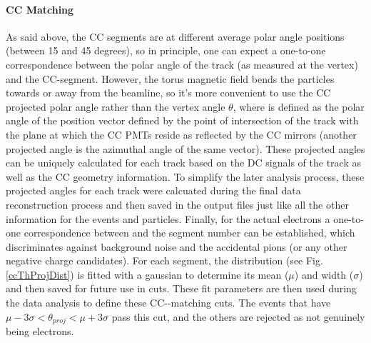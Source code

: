 \paragraph{CC \th Matching}
As said above, the CC segments are at different average polar angle positions (between 15 and 45 degrees), so in principle, one can expect a one-to-one correspondence between the polar angle of the track (as measured at the vertex) and the CC-segment. However, the torus magnetic field bends the particles towards or away from the beamline, so it's more convenient to use the CC projected polar angle \thp  rather than the vertex angle $\theta$, where \thp is defined as the polar angle of the position vector defined by the point of intersection of the track with %
the plane at which the CC PMTs reside as reflected by the CC mirrors %
(another projected angle \php is the azimuthal angle of the same vector). These projected angles can be uniquely calculated for each track based on the DC %
signals of the track as well as the CC geometry information. To simplify the later analysis process, these projected angles for each track were calcuated during the final %
 data reconstruction process and then saved in the output files %
  just like all the other %
 information for the events and particles. 
Finally, for the actual electrons a one-to-one correspondence between \thp and the segment number can be established, 
which discriminates against %
background noise and the accidental pions (or any other negative charge candidates). For each segment, the \thp distribution (see Fig. \ref{ccThProjDist}) is fitted with a gaussian %
to determine its mean ($\mu$) and width ($\sigma$) and then saved for future use in cuts. These fit parameters are then used during the data analysis to define these CC-\th-matching cuts. The events that have $\mu-3\sigma<\theta_{proj}<\mu+3\sigma$ pass this cut, and the others are rejected as not genuinely being electrons. %

